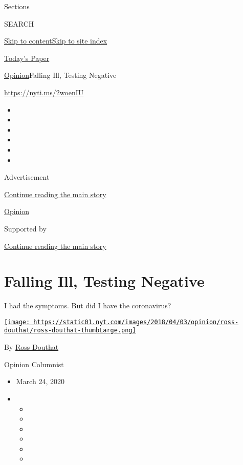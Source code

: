 Sections

SEARCH

\protect\hyperlink{site-content}{Skip to
content}\protect\hyperlink{site-index}{Skip to site index}

\href{https://myaccount.nytimes.com/auth/login?response_type=cookie\&client_id=vi}{}

\href{https://www.nytimes.com/section/todayspaper}{Today's Paper}

\href{/section/opinion}{Opinion}\textbar{}Falling Ill, Testing Negative

\href{https://nyti.ms/2woenIU}{https://nyti.ms/2woenIU}

\begin{itemize}
\item
\item
\item
\item
\item
\item
\end{itemize}

Advertisement

\protect\hyperlink{after-top}{Continue reading the main story}

\href{/section/opinion}{Opinion}

Supported by

\protect\hyperlink{after-sponsor}{Continue reading the main story}

\hypertarget{falling-ill-testing-negative}{%
\section{Falling Ill, Testing
Negative}\label{falling-ill-testing-negative}}

I had the symptoms. But did I have the coronavirus?

\href{https://www.nytimes.com/by/ross-douthat}{\texttt{[image: https://static01.nyt.com/images/2018/04/03/opinion/ross-douthat/ross-douthat-thumbLarge.png]}}

By \href{https://www.nytimes.com/by/ross-douthat}{Ross Douthat}

Opinion Columnist

\begin{itemize}
\item
  March 24, 2020
\item
  \begin{itemize}
  \item
  \item
  \item
  \item
  \item
  \item
  \end{itemize}
\end{itemize}

